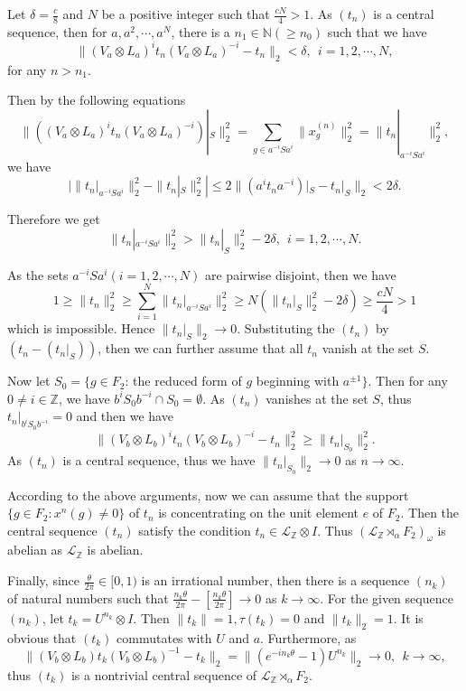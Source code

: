 \documentclass[12pt]{article}
\begin{document}
Let $\delta=\frac{c}{8}$ and $N$ be a positive integer such that
$\frac{cN}{4}>1$. As $(t_{n})$ is a central sequence, then for
$a,a^{2},\cdots,a^{N}$, there is a $n_{1}\in\mathbb{N}(\geqslant
n_{0})$ such that we have
$$\|(V_{a}\otimes L_{a})^{i}t_{n}(V_{a}\otimes L_{a})^{-i}-t_{n}\|_{2}<\delta,\     \ i=1,2,\cdots,N,$$
for any $n>n_{1}$.

Then by the following
equations
$$\|((V_{a}\otimes L_{a})^{i}t_{n}(V_{a}\otimes L_{a})^{-i})|_{S}\|^{2}_{2}= \sum_{g\in
a^{-i}Sa^{i}}\|x_{g}^{(n)}\|^{2}_{2}=\|t_{n}|_{a^{-i}Sa^{i}}\|_{2}^{2},$$
we have
$$|\|t_{n}|_{a^{-i}Sa^{i}}\|^{2}_{2}-\|t_{n}|_{S}\|^{2}_{2}|\leqslant
2\|(a^{i}t_{n}a^{-i})|_{S}-t_{n}|_{S}\|_{2}<2\delta.$$

Therefore we get
$$\|t_{n}|_{a^{-i}Sa^{i}}\|^{2}_{2}>\|t_{n}|_{S}\|^{2}_{2}-2\delta, \  \
i=1,2,\cdots,N.$$

As the sets $a^{-i}Sa^{i}(i=1,2,\cdots,N)$ are pairwise disjoint,
then we have
$$1\geqslant\|t_{n}\|^{2}_{2}\geqslant\sum_{i=1}^{N}\|t_{n}|_{a^{-i}Sa^{i}}\|_{2}^{2}\geqslant
N(\|t_{n}|_{S}\|^{2}_{2}-2\delta)\geqslant\frac{cN}{4}>1$$ which is
impossible. Hence $\|t_{n}|_{S}\|_{2}\rightarrow 0$. Substituting
the $(t_{n})$ by $(t_{n}-(t_{n}|_{S}))$, then we can further assume
that all $t_{n}$ vanish at the set $S$.


Now let $S_{0}=\{g\in F_{2}$: the reduced form of $g$ beginning with
$a^{\pm1}\}$. Then for any $0\neq i\in\mathbb{Z}$,
 we have $b^{i}S_{0}b^{-i}\cap S_{0}=\emptyset$. As $(t_{n})$ vanishes at the set $S$,
 thus $t_{n}|_{b^{i}S_{0}b^{-i}}=0$ and then we have
$$\|(V_{b}\otimes L_{b})^{i}t_{n}(V_{b}\otimes L_{b})^{-i}-t_{n}\|^{2}_{2}
\geqslant\|t_{n}|_{S_{0}}\|_{2}^{2}.$$ As $(t_{n})$ is a central
sequence, thus we have $\|t_{n}|_{S_{0}}\|_{2}\rightarrow0$ as
$n\rightarrow\infty$.

According to the above arguments, now we can assume that the support
$\{g\in F_{2}:x^{n}(g)\neq 0\}$ of $t_{n}$ is concentrating on the
unit element $e$ of $F_{2}$.
 Then the central sequence $(t_{n})$ satisfy the condition $t_{n}\in\mathcal{L}_{\mathbb{Z}}\otimes I$.
 Thus $(\mathcal{L}_{\mathbb{Z}}\rtimes_{\alpha}F_{2})_{\omega}$ is abelian as $\mathcal{L}_{\mathbb{Z}}$ is abelian.

Finally, since $\frac{\theta}{2\pi}\in[0,1)$ is an irrational
number, then there is a sequence $(n_{k})$ of natural numbers such
that $\frac{n_{k}\theta}{2\pi}-[\frac{n_{k}\theta}{2\pi}]\rightarrow
0$ as $k\rightarrow\infty$. For the given sequence $(n_{k})$, let
$t_{k}=U^{n_{k}}\otimes I$. Then $\|t_{k}\|=1,\tau(t_{k})=0$ and
$\|t_{k}\|_{2}=1$. It is obvious that $(t_{k})$ commutates with $U$
and $a$. Furthermore, as
$$\|(V_{b}\otimes L_{b})t_{k}(V_{b}\otimes L_{b})^{-1}-t_{k}\|_{2}=\|(e^{-in_{k}\theta}-1)U^{n_{k}}\|_{2}\rightarrow0,\   \ k\rightarrow \infty,$$
thus $(t_{k})$ is a nontrivial central sequence of
$\mathcal{L}_{\mathbb{Z}}\rtimes_{\alpha}F_{2}$. \endproof \vskip6pt
\end{document}
